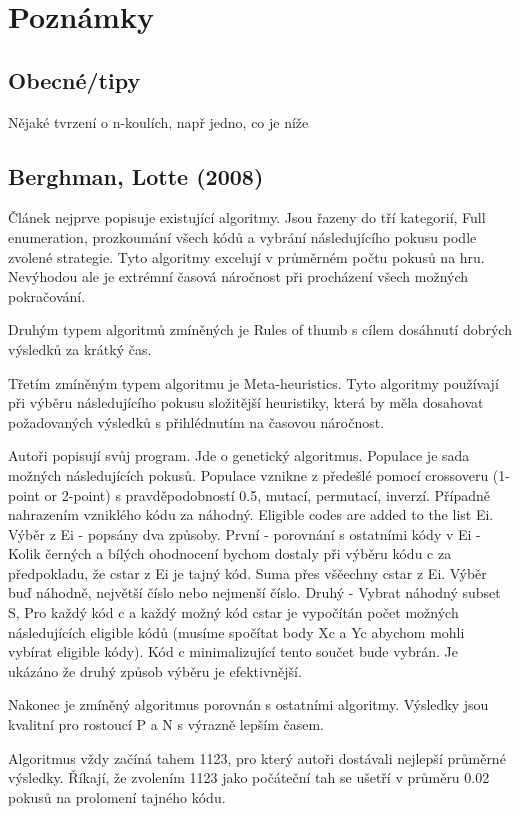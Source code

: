 \chapter{Poznámky}

\section{Obecné/tipy}
Nějaké tvrzení o n-koulích, např jedno, co je níže

\section{Berghman, Lotte (2008) \cite{BERGHMAN20091880}}
Článek nejprve popisuje existující algoritmy. Jsou řazeny do tří kategorií, Full enumeration, prozkoumání všech kódů a vybrání následujícího pokusu podle zvolené strategie. Tyto algoritmy excelují v průměrném počtu pokusů na hru. Nevýhodou ale je extrémní časová náročnost při procházení všech možných pokračování. 

Druhým typem algoritmů zmíněných je Rules of thumb s cílem dosáhnutí dobrých výsledků za krátký čas. 

Třetím zmíněným typem algoritmu je Meta-heuristics. Tyto algoritmy používají při výběru následujícího pokusu složitější heuristiky, která by měla dosahovat požadovaných výsledků s přihlédnutím na časovou náročnost. 

Autoři popisují svůj program. Jde o genetický algoritmus. Populace je sada možných následujících pokusů. Populace vznikne z předešlé pomocí crossoveru (1-point or 2-point) s pravděpodobností 0.5, mutací, permutací, inverzí. Případně nahrazením vzniklého kódu za náhodný. Eligible codes are added to the list Ei. Výběr z Ei - popsány dva způsoby. První - porovnání s ostatními kódy v Ei - Kolik černých a bílých ohodnocení bychom dostaly při výběru kódu c za předpokladu, že cstar z Ei je tajný kód. Suma přes všěechny cstar z Ei. Výběr buď náhodně, největší číslo nebo nejmenší číslo. Druhý - Vybrat náhodný subset S, Pro každý kód c a každý možný kód cstar je vypočítán počet možných následujících eligible kódů (musíme spočítat body Xc a Yc abychom mohli vybírat eligible kódy). Kód c minimalizující tento součet bude vybrán. Je ukázáno že druhý způsob výběru je efektivnější. 

Nakonec je zmíněný algoritmus porovnán s ostatními algoritmy. Výsledky jsou kvalitní pro rostoucí P a N s výrazně lepším časem. 

Algoritmus vždy začíná tahem 1123, pro který autoři dostávali nejlepší průměrné výsledky. Říkají, že zvolením 1123 jako počáteční tah se ušetří v průměru 0.02 pokusů na prolomení tajného kódu.



